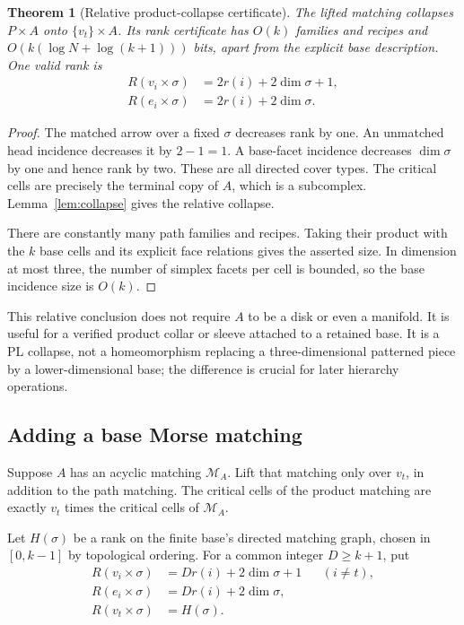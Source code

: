 \documentclass[11pt,letterpaper]{article}
\newtheorem{theorem}{Theorem}[section]
\theoremstyle{definition}
\theoremstyle{remark}\newtheorem{remark}[theorem]{Remark}
\begin{document}
\begin{theorem}[Relative product-collapse certificate]
\label{thm:relative-product}
The lifted matching collapses $P\times A$ onto $\{v_t\}\times A$. Its rank certificate has $O(k)$ families and recipes and $O(k(\log N+\log(k+1)))$ bits, apart from the explicit base description. One valid rank is
\begin{align*}
 R(v_i\times\sigma)&=2r(i)+2\dim\sigma+1,\\
 R(e_i\times\sigma)&=2r(i)+2\dim\sigma.
\end{align*}
\end{theorem}
\begin{proof}
The matched arrow over a fixed $\sigma$ decreases rank by one. An unmatched head incidence decreases it by $2-1=1$. A base-facet incidence decreases $\dim\sigma$ by one and hence rank by two. These are all directed cover types. The critical cells are precisely the terminal copy of $A$, which is a subcomplex. Lemma~\ref{lem:collapse} gives the relative collapse.

There are constantly many path families and recipes. Taking their product with the $k$ base cells and its explicit face relations gives the asserted size. In dimension at most three, the number of simplex facets per cell is bounded, so the base incidence size is $O(k)$.
\end{proof}

This relative conclusion does not require $A$ to be a disk or even a manifold. It is useful for a verified product collar or sleeve attached to a retained base. It is a PL collapse, not a homeomorphism replacing a three-dimensional patterned piece by a lower-dimensional base; the difference is crucial for later hierarchy operations.

\subsection{Adding a base Morse matching}

Suppose $A$ has an acyclic matching $\mathcal M_A$. Lift that matching only over $v_t$, in addition to the path matching. The critical cells of the product matching are exactly $v_t$ times the critical cells of $\mathcal M_A$.

Let $H(\sigma)$ be a rank on the finite base's directed matching graph, chosen in $[0,k-1]$ by topological ordering. For a common integer $D\geq k+1$, put
\begin{align}
 R(v_i\times\sigma)&=Dr(i)+2\dim\sigma+1 &&(i\ne t),\nonumber\\
 R(e_i\times\sigma)&=Dr(i)+2\dim\sigma,\label{eq:productrank}\\
 R(v_t\times\sigma)&=H(\sigma).\nonumber
\end{align}
\end{document}
